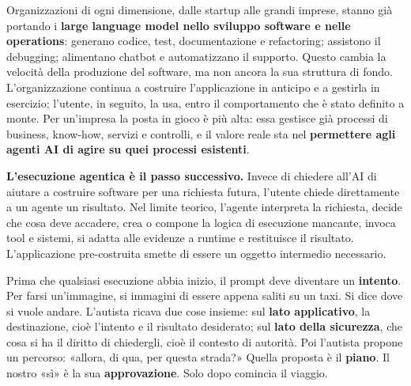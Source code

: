 \documentclass[10pt,oneside,openany]{book}
\begin{document}
{\small{}\setlength{\parskip}{0.4pt}
Organizzazioni di ogni dimensione, dalle startup alle grandi imprese, stanno già portando i \textbf{large language model nello sviluppo software e nelle operations}: generano codice, test, documentazione e refactoring; assistono il debugging; alimentano chatbot e automatizzano il supporto. Questo cambia la velocità della produzione del software, ma non ancora la sua struttura di fondo. L'organizzazione continua a costruire l'applicazione in anticipo e a gestirla in esercizio; l'utente, in seguito, la usa, entro il comportamento che è stato definito a monte. Per un'impresa la posta in gioco è più alta: essa gestisce già processi di business, know-how, servizi e controlli, e il valore reale sta nel \textbf{permettere agli agenti AI di agire su quei processi esistenti}.

\textbf{L'esecuzione agentica è il passo successivo.} Invece di chiedere all'AI di aiutare a costruire software per una richiesta futura, l'utente chiede direttamente a un agente un risultato. Nel limite teorico, l'agente interpreta la richiesta, decide che cosa deve accadere, crea o compone la logica di esecuzione mancante, invoca tool e sistemi, si adatta alle evidenze a runtime e restituisce il risultato. L'applicazione pre-costruita smette di essere un oggetto intermedio necessario.

Prima che qualsiasi esecuzione abbia inizio, il prompt deve diventare un \textbf{intento}. Per farsi un'immagine, si immagini di essere appena saliti su un taxi. Si dice dove si vuole andare. L'autista ricava due cose insieme: sul \textbf{lato applicativo}, la destinazione, cioè l'intento e il risultato desiderato; sul \textbf{lato della sicurezza}, che cosa si ha il diritto di chiedergli, cioè il contesto di autorità. Poi l'autista propone un percorso: «allora, di qua, per questa strada?» Quella proposta è il \textbf{piano}. Il nostro «sì» è la sua \textbf{approvazione}. Solo dopo comincia il viaggio.

}
\end{document}
